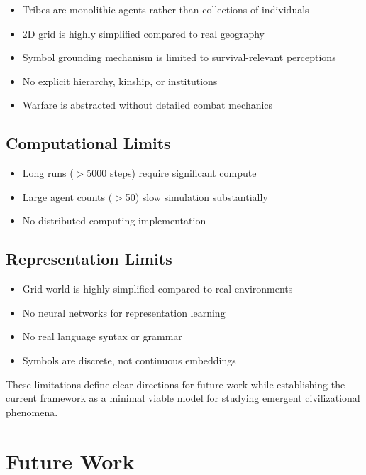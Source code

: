 \documentclass[11pt,a4paper]{article}
\begin{document}
\begin{itemize}
    \item Tribes are monolithic agents rather than collections of individuals
    \item 2D grid is highly simplified compared to real geography
    \item Symbol grounding mechanism is limited to survival-relevant perceptions
    \item No explicit hierarchy, kinship, or institutions
    \item Warfare is abstracted without detailed combat mechanics
\end{itemize}

\subsection{Computational Limits}

\begin{itemize}
    \item Long runs ($>$5000 steps) require significant compute
    \item Large agent counts ($>$50) slow simulation substantially
    \item No distributed computing implementation
\end{itemize}

\subsection{Representation Limits}

\begin{itemize}
    \item Grid world is highly simplified compared to real environments
    \item No neural networks for representation learning
    \item No real language syntax or grammar
    \item Symbols are discrete, not continuous embeddings
\end{itemize}

These limitations define clear directions for future work while establishing the current framework as a minimal viable model for studying emergent civilizational phenomena.

\section{Future Work}
\end{document}
